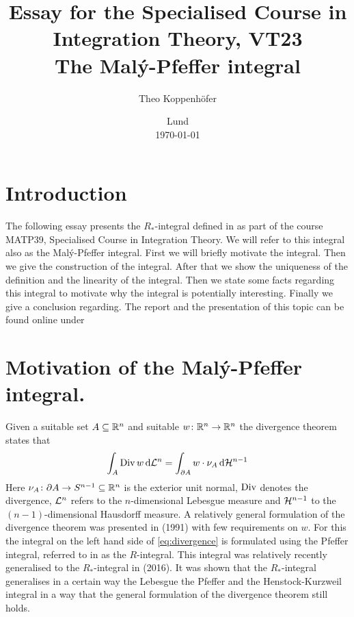 




\title{ Essay for the Specialised Course in Integration Theory, VT23 \\[1ex]
	  \large The Malý-Pfeffer integral}
\author{Theo Koppenhöfer}
\date{Lund \\[1ex] \today}







\maketitle

\section{Introduction}

The following essay presents the $R_*$-integral defined in \cite{Pfe2016} as part of the course MATP39, Specialised Course in Integration Theory. We will refer to this integral also as the Malý-Pfeffer integral. First we will briefly motivate the integral. Then we give the construction of the integral. After that we show the uniqueness of the definition and the linearity of the integral. Then we state some facts regarding this integral to motivate why the integral is potentially interesting. Finally we give a conclusion regarding. The report and the presentation of this topic can be found online under \cite{Repository}


\section{Motivation of the Malý-Pfeffer integral.}

Given a suitable set $A\subseteq\mathbb{R}^n$ and suitable $w\colon\mathbb{R}^n\to\mathbb{R}^n$ the divergence theorem states that
\begin{align}
	\int_A\operatorname{Div} w\,\mathrm{d} \mathcal{L}^n=\int_{\partial A}w\cdot\nu_A\,\mathrm{d} \mathcal{H}^{n-1}\label{eq:divergence}
\end{align}
Here $\nu_A\colon \partial A\to S^{n-1}\subseteq\mathbb{R}^n$ is the exterior unit normal, $\operatorname{Div}$ denotes the divergence, $\mathcal{L}^n$ refers to the $n$-dimensional Lebesgue measure and $\mathcal{H}^{n-1}$ to the $(n-1)$-dimensional Hausdorff measure. A relatively general formulation of the divergence theorem was presented in \cite{Pfe1991} (1991) with few requirements on $w$. For this the integral on the left hand side of \eqref{eq:divergence} is formulated using the Pfeffer integral, referred to in \cite{Pfe2016} as the $R$-integral. This integral was relatively recently generalised to the $R_*$-integral in \cite{Pfe2016} (2016). It was shown that the $R_*$-integral generalises in a certain way the Lebesgue the Pfeffer and the Henstock-Kurzweil integral in a way that the general formulation of the divergence theorem still holds.

